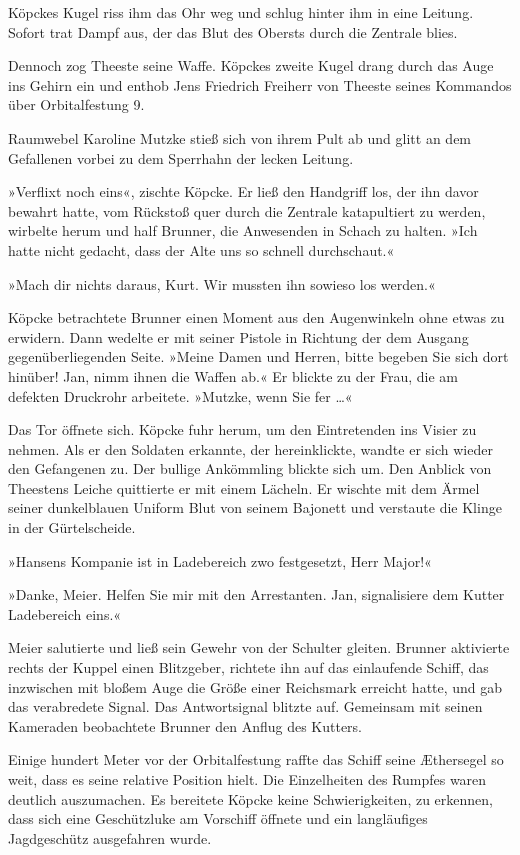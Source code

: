Köpckes Kugel riss ihm das Ohr weg und schlug hinter ihm in eine
Leitung. Sofort trat Dampf aus, der das Blut des Obersts durch die
Zentrale blies.

Dennoch zog Theeste seine Waffe. Köpckes zweite Kugel drang durch
das Auge ins Gehirn ein und enthob Jens Friedrich Freiherr von
Theeste seines Kommandos über Orbitalfestung 9.

Raumwebel Karoline Mutzke stieß sich von ihrem Pult ab und glitt an
dem Gefallenen vorbei zu dem Sperrhahn der lecken Leitung.

»Verflixt noch eins«, zischte Köpcke. Er ließ den Handgriff los,
der ihn davor bewahrt hatte, vom Rückstoß quer durch die Zentrale
katapultiert zu werden, wirbelte herum und half Brunner, die
Anwesenden in Schach zu halten. »Ich hatte nicht gedacht, dass der
Alte uns so schnell durchschaut.«

»Mach dir nichts daraus, Kurt. Wir mussten ihn sowieso los
werden.«

Köpcke betrachtete Brunner einen Moment aus den Augenwinkeln ohne
etwas zu erwidern. Dann wedelte er mit seiner Pistole in Richtung
der dem Ausgang gegenüberliegenden Seite. »Meine Damen und Herren,
bitte begeben Sie sich dort hinüber! Jan, nimm ihnen die Waffen
ab.« Er blickte zu der Frau, die am defekten Druckrohr arbeitete.
»Mutzke, wenn Sie fer …«

Das Tor öffnete sich. Köpcke fuhr herum, um den Eintretenden ins
Visier zu nehmen. Als er den Soldaten erkannte, der hereinklickte,
wandte er sich wieder den Gefangenen zu. Der bullige Ankömmling
blickte sich um. Den Anblick von Theestens Leiche quittierte er mit
einem Lächeln. Er wischte mit dem Ärmel seiner dunkelblauen Uniform
Blut von seinem Bajonett und verstaute die Klinge in der
Gürtelscheide.

»Hansens Kompanie ist in Ladebereich zwo festgesetzt, Herr Major!«

»Danke, Meier. Helfen Sie mir mit den Arrestanten. Jan,
signalisiere dem Kutter Ladebereich eins.«

Meier salutierte und ließ sein Gewehr von der Schulter gleiten.
Brunner aktivierte rechts der Kuppel einen Blitzgeber, richtete ihn
auf das einlaufende Schiff, das inzwischen mit bloßem Auge die
Größe einer Reichsmark erreicht hatte, und gab das verabredete
Signal. Das Antwortsignal blitzte auf. Gemeinsam mit seinen
Kameraden beobachtete Brunner den Anflug des Kutters.

Einige hundert Meter vor der Orbitalfestung raffte das Schiff seine
Æthersegel so weit, dass es seine relative Position hielt. Die
Einzelheiten des Rumpfes waren deutlich auszumachen. Es bereitete
Köpcke keine Schwierigkeiten, zu erkennen, dass sich eine
Geschützluke am Vorschiff öffnete und ein langläufiges Jagdgeschütz
ausgefahren wurde.

